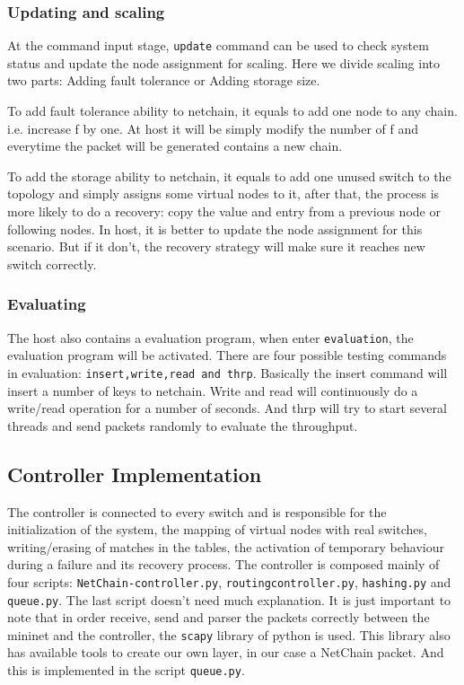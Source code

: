 \documentclass[11pt,oneside,a4paper]{article}
\begin{document}
\subsubsection{Updating and scaling}
At the command input stage, {\color{brown}\texttt{update}} command can be used to check system status and update the node assignment for scaling. Here we divide scaling into two parts: Adding fault tolerance or Adding storage size. 

To add fault tolerance ability to netchain, it equals to add one node to any chain. i.e. increase f by one. At host it will be simply modify the number of f and everytime the packet will be generated contains a new chain.

To add the storage ability to netchain, it equals to add one unused switch to the topology and simply assigns some virtual nodes to it, after that, the process is more likely to do a recovery: copy the value and entry from a previous node or following nodes. In host, it is better to update the node assignment for this scenario. But if it don't, the recovery strategy will make sure it reaches new switch correctly.
\subsubsection{Evaluating}
The host also contains a evaluation program, when enter {\color{brown}\texttt{evaluation}}, the evaluation program will be activated. There are four possible testing commands in evaluation: {\color{brown}\texttt{insert,write,read and thrp}}. Basically the insert command will insert a number of keys to netchain. Write and read will continuously do a write/read operation for a number of seconds. And thrp will try to start several threads and send packets randomly to evaluate the throughput.

\subsection{Controller Implementation}

The controller is connected to every switch and is responsible for the initialization of the system, the mapping of virtual nodes with real switches, writing/erasing  of matches in the tables, the activation of temporary behaviour during a failure and its recovery process. The controller is composed mainly of four scripts: {\color{violet}\texttt{NetChain-controller.py}}, {\color{violet}\texttt{routingcontroller.py}}, {\color{violet}\texttt{hashing.py}} and {\color{violet}\texttt{queue.py}}. The last script doesn't need much explanation. It is just important to note that in order receive, send and parser the packets correctly between the mininet and the controller, the {\color{brown}\texttt{scapy}} library of python is used. This library also has available tools to create our own layer, in our case a NetChain packet. And this is implemented in the script {\color{violet}\texttt{queue.py}}. 
\end{document}
